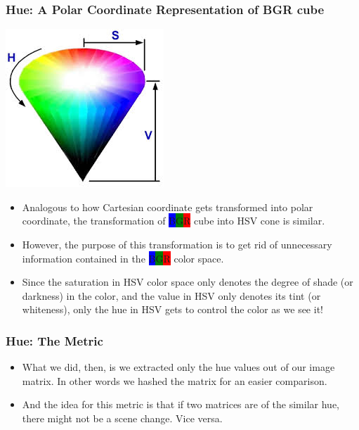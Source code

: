 \documentclass{beamer}
\begin{document}
	\begin{frame}
	\frametitle{Hue: A Polar Coordinate Representation of BGR cube}
		
		\includegraphics[scale = 0.4]{HSVcone}
	
		\begin{itemize}
			
			\item Analogous to how Cartesian coordinate gets transformed into polar coordinate, the transformation of \colorbox{blue}{B}\colorbox{green}{G}\colorbox{red}{R} cube into HSV cone is similar.
			
			\pause
			
			\item However, the purpose of this transformation is to get rid of unnecessary information contained in the \colorbox{blue}{B}\colorbox{green}{G}\colorbox{red}{R} color space.
			
			\item Since the saturation in HSV color space only denotes the degree of shade (or darkness) in the color, and the value in HSV only denotes its tint (or whiteness), only the hue in HSV gets to control the color as we see it!
		\end{itemize}
	\end{frame}
	
	\begin{frame}
	\frametitle{Hue: The Metric}
		
		\begin{itemize}
			\item What we did, then, is we extracted only the hue values out of our image matrix. In other words we hashed the matrix for an easier comparison.
			
			\item And the idea for this metric is that if two matrices are of the similar hue, there might not be a scene change. Vice versa.
		\end{itemize}
	\end{frame}
	
\end{document}
